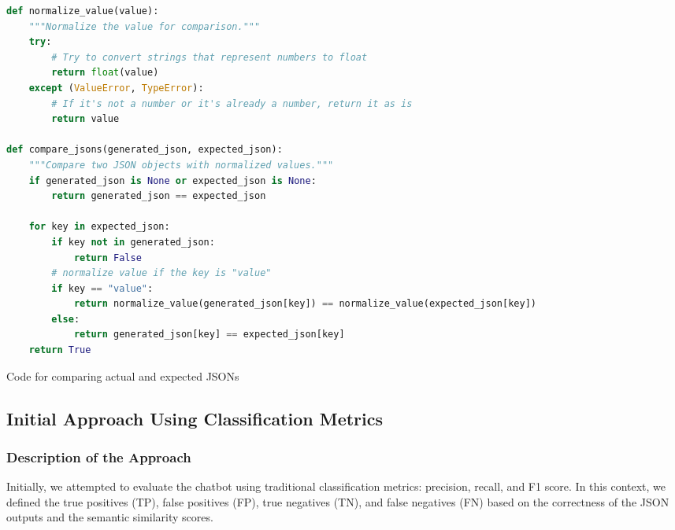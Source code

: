 \begin{Listing}
    \begin{lstlisting}[language=Python]
def normalize_value(value):
    """Normalize the value for comparison."""
    try:
        # Try to convert strings that represent numbers to float
        return float(value)
    except (ValueError, TypeError):
        # If it's not a number or it's already a number, return it as is
        return value

def compare_jsons(generated_json, expected_json):
    """Compare two JSON objects with normalized values."""
    if generated_json is None or expected_json is None:
        return generated_json == expected_json
    
    for key in expected_json:
        if key not in generated_json:
            return False
        # normalize value if the key is "value"
        if key == "value":
            return normalize_value(generated_json[key]) == normalize_value(expected_json[key])
        else:
            return generated_json[key] == expected_json[key]
    return True
    \end{lstlisting}
    \caption{Code for comparing actual and expected JSONs}
    \label{lst:compare-json}   
\end{Listing}

\subsection{Initial Approach Using Classification Metrics}

\subsubsection{Description of the Approach}

Initially, we attempted to evaluate the chatbot using traditional classification metrics: precision, recall, and F1 score. In this context, we defined the true positives (TP), false positives (FP), true negatives (TN), and false negatives (FN) based on the correctness of the JSON outputs and the semantic similarity scores.

\begin{lstlisting}[language=Python, caption=Classification Metrics]

\end{lstlisting}


